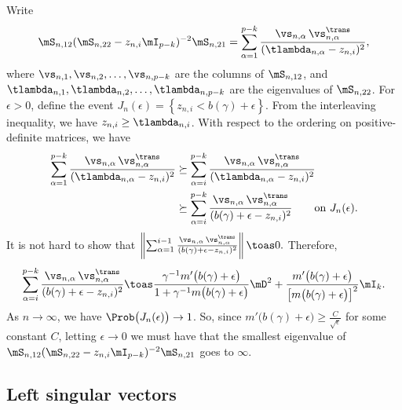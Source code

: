 Write
\[
    \mS_{n,12}
    ( \mS_{n,22} - z_{n,i} \mI_{p-k} )^{-2} 
    \mS_{n,21}
        =
        \sum_{\alpha=1}^{p-k}
            \frac{ \vs_{n,\alpha} \, \vs_{n,\alpha}^\trans }
                 { ( \tlambda_{n,\alpha} - z_{n,i} )^2 },
\]
where $\vs_{n,1}, \vs_{n,2}, \ldots, \vs_{n,p-k}$ are the 
columns of $\mS_{n,12}$, and
$\tlambda_{n,1}, \tlambda_{n,2}, \ldots, \tlambda_{n,p-k}$ are the eigenvalues
of $\mS_{n,22}$.  For $\epsilon > 0$, define the event 
\(
    J_{n}(\epsilon)
    =
    \left\{
        z_{n,i} < b(\gamma) + \epsilon
    \right\}.
\)
From the interleaving inequality, we have $z_{n,i} \geq \tlambda_{n,i}$.
With respect to the ordering on positive-definite matrices, we have
\begin{align*}
    \sum_{\alpha=1}^{p-k}
            \frac{ \vs_{n,\alpha} \, \vs_{n,\alpha}^\trans }
                 { ( \tlambda_{n,\alpha} - z_{n,i} )^2 }
        &\succeq
            \sum_{\alpha=i}^{p-k}
                    \frac{ \vs_{n,\alpha} \, \vs_{n,\alpha}^\trans }
                         { ( \tlambda_{n,\alpha} - z_{n,i} )^2 } \\
        &\succeq
            \sum_{\alpha=i}^{p-k}
                    \frac{ \vs_{n,\alpha} \, \vs_{n,\alpha}^\trans }
                         { ( b(\gamma) + \epsilon - z_{n,i} )^2 }
            \qquad\text{on $J_n(\epsilon)$.}
\end{align*}
It is not hard to show that
\(
    \left\|
        \sum_{\alpha=1}^{i-1}
                \frac{ \vs_{n,\alpha} \, \vs_{n,\alpha}^\trans }
                     { ( b(\gamma) + \epsilon - z_{n,i} )^2 }
    \right\|
        \toas 0.
\)
Therefore,
\[
    \sum_{\alpha=i}^{p-k}
            \frac{ \vs_{n,\alpha} \, \vs_{n,\alpha}^\trans }
                 { ( b(\gamma) + \epsilon - z_{n,i} )^2 }
        \toas
        \frac{ \gamma^{-1} m'\big( b(\gamma) + \epsilon \big) }
             { 1 + \gamma^{-1} m\big( b(\gamma) + \epsilon \big)}
        \mD^2
        +
        \frac{ m'\big( b(\gamma) + \epsilon \big) }
             { \left[ m\big( b(\gamma) + \epsilon \big) \right]^2}
        \mI_k.
\]
As $n\to\infty$, we have $\Prob\big( J_n(\epsilon) \big) \to 1$.  So,
since $m'\big( b(\gamma) + \epsilon \big) \geq \frac{C}{\sqrt{\epsilon}}$
for some constant $C$, 
letting $\epsilon \to 0$ we must have that the smallest eigenvalue of
\(
    \mS_{n,12}
    ( \mS_{n,22} - z_{n,i} \mI_{p-k} )^{-2} 
    \mS_{n,21}
\)
goes to $\infty$.

\subsection{Left singular vectors}

